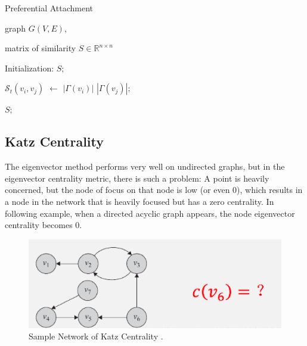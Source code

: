 \documentclass{article}
\begin{document}
\begin{algorithm}

	\caption{ Preferential Attachment}

	\label{PA} 
	\begin{algorithmic}

		\REQUIRE
		graph $G(V,E)$,

		\ENSURE

		matrix of similarity $S \in \mathbb{R}^{n \times n}$

		\STATE Initialization: $S;$



		\STATE $\mathcal{S}_t(v_i,v_j)$ $\gets$ $|\Gamma(v_i)|$ $|\Gamma(v_j)|;$

		\ENDFOR	

		\ENDFOR	

		\STATE \RETURN $S;$

	\end{algorithmic}

\end{algorithm}


\subsection{Katz Centrality}

The eigenvector method performs very well on undirected graphs, but in the eigenvector centrality metric, there is such a problem: A point is heavily concerned, but the node of focus on that node is low (or even 0), which results in a node in the network that is heavily focused but has a zero centrality. In following example, when a directed acyclic graph appears, the node eigenvector centrality becomes 0. \\

\begin{figure}[h!]
	\includegraphics{images/kz_nw.png}
	\centering
	\caption{Sample Network of Katz Centrality .}	\label{KZ_NW}
\end{figure}
\end{document}

